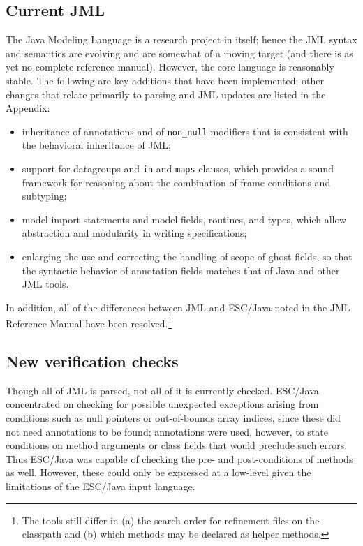 \documentclass{llncs}
\begin{document}
\subsection{Current JML}

The Java Modeling Language is a research project in itself; hence the
JML syntax and semantics are evolving and are somewhat of a moving
target (and there is as yet no complete reference manual).  However,
the core language is reasonably stable.  The following are key
additions that have been implemented; other changes that relate
primarily to parsing and JML updates are listed in the Appendix:

\setlength{\partopsep}{0in}\setlength{\parskip}{0in}\setlength{\itemsep}{0in}\setlength{\topsep}{0in}
\begin{itemize}
\setlength{\partopsep}{0in}\setlength{\parskip}{0in}\setlength{\itemsep}{0in}\setlength{\topsep}{0in}
\item inheritance of annotations and of \texttt{non\_null} modifiers
  that is consistent with the behavioral inheritance of JML;
\item support for datagroups and \texttt{in} and \texttt{maps}
  clauses, which provides a sound framework for reasoning about the
  combination of frame conditions and subtyping;
\item model import statements and model fields, routines, and types,
  which allow abstraction and modularity in writing specifications;
\item enlarging the use and correcting the handling of scope of ghost
  fields, so that the syntactic behavior of annotation fields matches
  that of Java and other JML tools.
\end{itemize}
In addition, all of the differences between JML and ESC/Java noted in
the JML Reference Manual have been resolved.\footnote{The tools still differ 
in (a) the search order for refinement files on the classpath and (b) which
methods may be declared as helper methods.}

\subsection{New verification checks}
Though all of JML is parsed, not all of it is currently checked.
ESC/Java concentrated on checking for possible unexpected exceptions
arising from conditions such as null pointers or out-of-bounds array
indices, since these did not need annotations to be found; annotations
were used, however, to state conditions on method arguments or class
fields that would preclude such errors.  Thus ESC/Java was capable of
checking the pre- and post-conditions of methods as well.  However,
these could only be expressed at a low-level given the limitations of
the ESC/Java input language.
\end{document}
